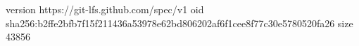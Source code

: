version https://git-lfs.github.com/spec/v1
oid sha256:b2ffe2bfb7f15f211436a53978e62bd806202af6f1cee8f77c30e5780520fa26
size 43856
